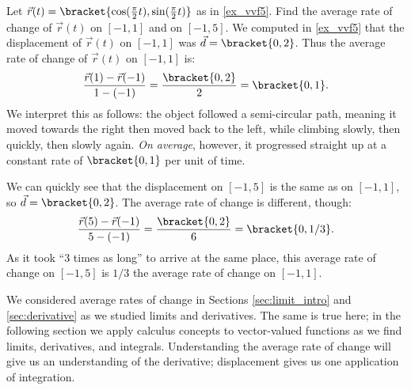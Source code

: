 \begin{example}\label{ex_vvf6}
Let $\vec r(t) =\bracket{\cos(\frac{\pi}2t),\sin(\frac{\pi}2t)}$ as in \autoref{ex_vvf5}. Find the average rate of change of $\vec r(t)$ on $[-1,1]$ and on $[-1,5]$.
\solution
We computed in \autoref{ex_vvf5} that the displacement of $\vec r(t)$ on $[-1,1]$ was $\vec d =\bracket{0,2}$. Thus the average rate of change of $\vec r(t)$ on $[-1,1]$ is:
\[\frac{\vec r(1) -\vec r(-1)}{1-(-1)} = \frac{\bracket{0,2}}{2} =\bracket{0,1}.\]
We interpret this as follows: the object followed a semi-circular path, meaning it moved towards the right then moved back to the left, while climbing slowly, then quickly, then slowly again. \emph{On average}, however, it progressed straight up at a constant rate of $\bracket{0,1}$ per unit of time.

We can quickly see that the displacement on $[-1,5]$ is the same as on $[-1,1]$, so $\vec d =\bracket{0,2}$. The average rate of change is different, though:
\[\frac{\vec r(5)-\vec r(-1)}{5-(-1)} = \frac{\bracket{0,2}}{6} =\bracket{0,1/3}.\]
As it took ``3 times as long'' to arrive at the same place, this average rate of change on $[-1,5]$ is $1/3$ the average rate of change on $[-1,1]$.
\end{example}

We considered average rates of change in Sections \ref{sec:limit_intro} and \ref{sec:derivative} as we studied limits and derivatives. The same is true here; in the following section we apply calculus concepts to vector-valued functions as we find limits, derivatives, and integrals. Understanding the average rate of change will give us an understanding of the derivative; displacement gives us one application of integration.

